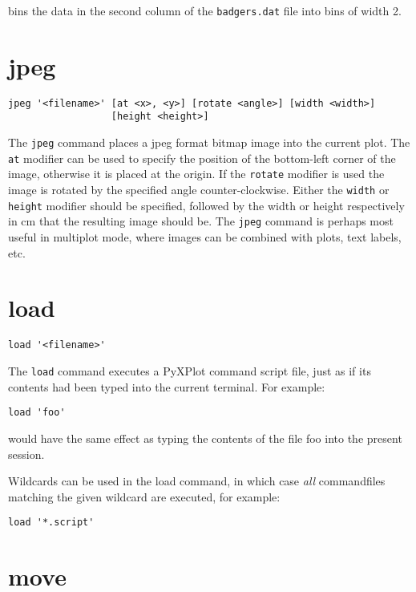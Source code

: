 \documentclass[a4paper,onecolumn,11pt]{book}
\begin{document}
\noindent bins the data in the second column of the {\tt badgers.dat} file into
bins of width 2.

\section{jpeg}

\begin{verbatim}
jpeg '<filename>' [at <x>, <y>] [rotate <angle>] [width <width>]
                  [height <height>]
\end{verbatim}

The {\tt jpeg} command places a jpeg format bitmap image into the current plot.
The {\tt at} modifier can be used to specify the position of the bottom-left
corner of the image, otherwise it is placed at the origin.  If the {\tt rotate}
modifier is used the image is rotated by the specified angle counter-clockwise.
Either the {\tt width} or {\tt height} modifier should be specified, followed by
the width or height respectively in cm that the resulting image should be.  The
{\tt jpeg} command is perhaps most useful in multiplot mode, where images can be
combined with plots, text labels, etc.

\section{load}

\begin{verbatim}
load '<filename>'
\end{verbatim}

The {\tt load} command executes a PyXPlot command script file, just as if its
contents had been typed into the current terminal. For example:

\begin{verbatim}
load 'foo'
\end{verbatim}

\noindent would have the same effect as typing the contents of the file foo
into the present session.

Wildcards can be used in the load command, in which case \textit{all}
commandfiles matching the given wildcard are executed, for example:

\begin{verbatim}
load '*.script'
\end{verbatim}


\section{move}
\end{document}
